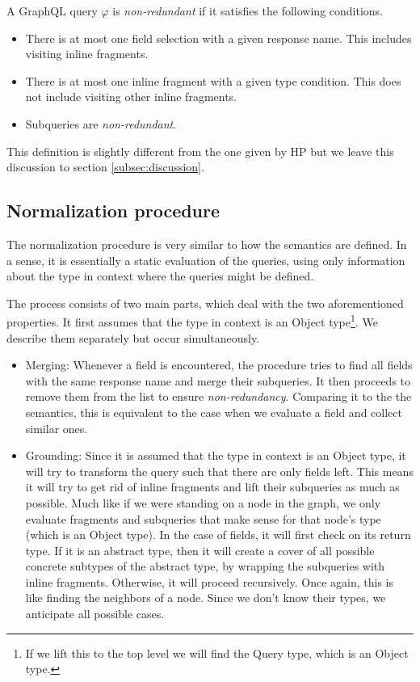 \begin{definition}
A GraphQL query $\varphi$ is \textit{non-redundant} if it satisfies the following conditions.
\begin{itemize}
    \item There is at most one field selection with a given response name. This includes visiting inline fragments.
    
    \item There is at most one inline fragment with a given type condition. This does not include visiting other inline fragments.
    
    \item Subqueries are \textit{non-redundant}.
\end{itemize}
\end{definition}

This definition is slightly different from the one given by HP but we leave this discussion to section \ref{subsec:discussion}.


\subsection{Normalization procedure}

The normalization procedure is very similar to how the semantics are defined. In a sense, it is essentially a static evaluation of the queries, using only information about the type in context where the queries might be defined.

The process consists of two main parts, which deal with the two aforementioned properties. It first assumes that the type in context is an Object type\footnote{If we lift this to the top level we will find the Query type, which is an Object type.}. We describe them separately but occur simultaneously.

\begin{itemize}
    \item Merging: Whenever a field is encountered, the procedure tries to find all fields with the same response name and merge their subqueries. It then proceeds to remove them from the list to ensure \textit{non-redundancy}. Comparing it to the the semantics, this is equivalent to the case when we evaluate a field and collect similar ones.
    
    \item Grounding: Since it is assumed that the type in context is an Object type, it will try to transform the query such that there are only fields left. This means it will try to get rid of inline fragments and lift their subqueries as much as possible. Much like if we were standing on a node in the graph, we only evaluate fragments and subqueries that make sense for that node's type (which is an Object type). In the case of fields, it will first check on its return type. If it is an abstract type, then it will create a cover of all possible concrete subtypes of the abstract type, by wrapping the subqueries with inline fragments. Otherwise, it will proceed recursively. Once again, this is like finding the neighbors of a node. Since we don't know their types, we anticipate all possible cases.
\end{itemize}

